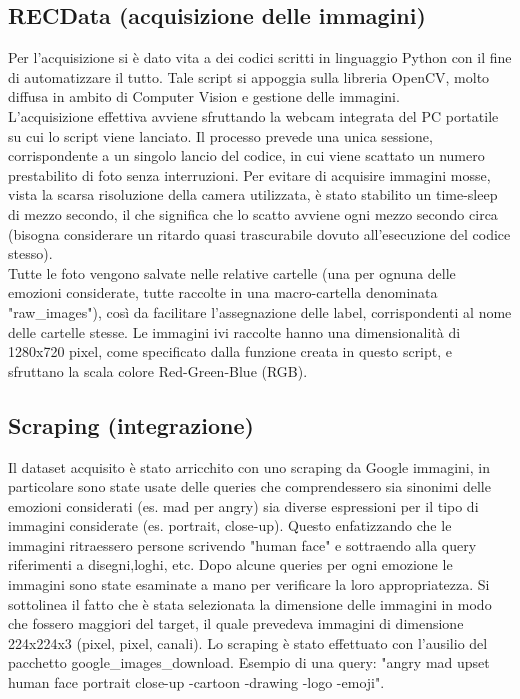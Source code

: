 \subsection{RECData (acquisizione delle immagini)}
Per l'acquisizione si è dato vita a dei codici scritti in linguaggio Python con il fine di automatizzare il tutto. Tale script si appoggia sulla libreria OpenCV, molto diffusa in ambito di Computer Vision e gestione delle immagini.\\
L'acquisizione effettiva avviene sfruttando la webcam integrata del PC portatile su cui lo script viene lanciato. Il processo prevede una unica sessione, corrispondente a un singolo lancio del codice, in cui viene scattato un numero prestabilito di foto senza interruzioni. Per evitare di acquisire immagini mosse, vista la scarsa risoluzione della camera utilizzata, è stato stabilito un time-sleep di mezzo secondo, il che significa che lo scatto avviene ogni mezzo secondo circa (bisogna considerare un ritardo quasi trascurabile dovuto all'esecuzione del codice stesso).\\
Tutte le foto vengono salvate nelle relative cartelle (una per ognuna delle emozioni considerate, tutte raccolte in una macro-cartella denominata "raw\_images"), così da facilitare l'assegnazione delle label, corrispondenti al nome delle cartelle stesse.
Le immagini ivi raccolte hanno una dimensionalità di 1280x720 pixel, come specificato dalla  funzione creata in questo script, e sfruttano la scala colore Red-Green-Blue (RGB).

\subsection{Scraping (integrazione)}
Il dataset acquisito è stato arricchito con uno scraping da Google immagini, in particolare sono state usate delle queries che comprendessero sia sinonimi delle emozioni considerati (es. mad per angry) sia diverse espressioni per il tipo di immagini considerate (es. portrait, close-up). Questo enfatizzando che le immagini ritraessero persone scrivendo "human face" e sottraendo alla query riferimenti a disegni,loghi, etc.
Dopo alcune queries per ogni emozione le immagini sono state esaminate a mano per verificare la loro appropriatezza. Si sottolinea il fatto che è stata selezionata la dimensione delle immagini in modo che fossero maggiori del target, il quale prevedeva immagini di dimensione 224x224x3 (pixel, pixel, canali). Lo scraping è stato effettuato con l'ausilio del pacchetto google\_images\_download.
Esempio di una query: "angry mad upset human face portrait close-up -cartoon -drawing -logo -emoji".

